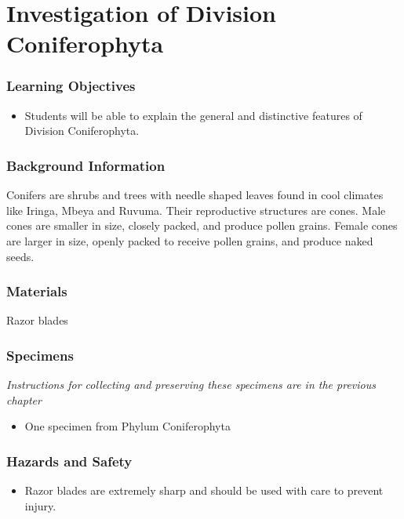 \section{Investigation of Division Coniferophyta}

\subsubsection*{Learning Objectives}
\begin{itemize}
\item{Students will be able to explain the general and distinctive features of Division Coniferophyta.}
\end{itemize}

\subsubsection*{Background Information}
Conifers are shrubs and trees with needle shaped leaves found in cool climates like Iringa, Mbeya and Ruvuma. Their reproductive structures are cones. Male cones are smaller in size, closely packed, and produce pollen grains. Female cones are larger in size, openly packed to receive pollen grains, and produce naked seeds.

\subsubsection*{Materials}
Razor blades

\subsubsection*{Specimens}
\textit{Instructions for collecting and preserving these specimens are in the previous chapter}
\begin{itemize}
\item{One specimen from Phylum Coniferophyta}
\end{itemize}

\subsubsection*{Hazards and Safety}
\begin{itemize}
\item{Razor blades are extremely sharp and should be used with care to prevent injury.}
\end{itemize}

